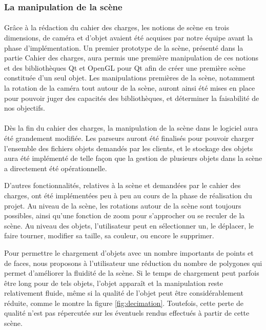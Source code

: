 \subsubsection{La manipulation de la scène}
\paragraph{}
Grâce à la rédaction du cahier des charges, les notions de scène en trois dimensions, de caméra et d'objet avaient été acquises par notre équipe avant la phase d'implémentation. Un premier prototype de la scène, présenté dans la partie Cahier des charges, aura permis une première manipulation de ces notions et des bibliothèques Qt et OpenGL pour Qt afin de créer une première scène constituée d'un seul objet. Les manipulations premières de la scène, notamment la rotation de la caméra tout autour de la scène, auront ainsi été mises en place pour pouvoir juger des capacités des bibliothèques, et déterminer la faisabilité de nos objectifs.

\paragraph{}
Dès la fin du cahier des charges, la manipulation de la scène dans le logiciel aura été grandement modifiée. Les parseurs auront été finalisés pour pouvoir charger l'ensemble des fichiers objets demandés par les clients, et le stockage des objets aura été implémenté de telle façon que la gestion de plusieurs objets dans la scène a directement été opérationnelle. 

D'autres fonctionnalités, relatives à la scène et demandées par le cahier des charges, ont été implémentées peu à peu au cours de la phase de réalisation du projet. Au niveau de la scène, les rotations autour de la scène sont toujours possibles, ainsi qu'une fonction de zoom pour s'approcher ou se reculer de la scène. Au niveau des objets, l'utilisateur peut en sélectionner un, le déplacer, le faire tourner, modifier sa taille, sa couleur, ou encore le supprimer.

Pour permettre le chargement d'objets avec un nombre importants de points et de faces, nous proposons à l'utilisateur une réduction du nombre de polygones qui permet d'améliorer la fluidité de la scène. Si le temps de chargement peut parfois être long pour de tels objets, l'objet apparaît et la manipulation reste relativement fluide, même si la qualité de l'objet peut être considérablement réduite, comme le montre la figure \ref{fig:decimation}. Toutefois, cette perte de qualité n'est pas répercutée sur les éventuels rendus effectués à partir de cette scène.

